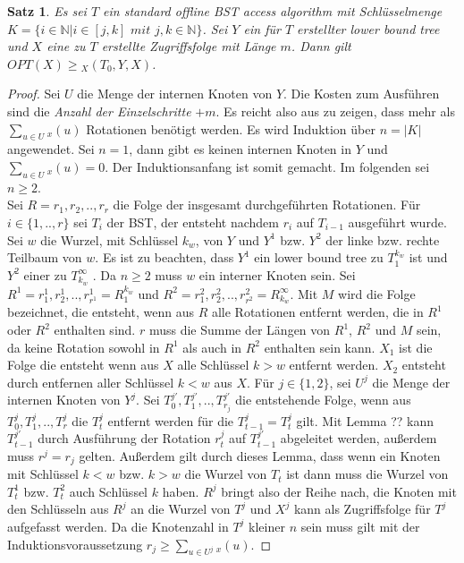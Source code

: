 \documentclass[a4paper,12pt]{article}
\begin{document}
\newtheorem{Satz1}{Satz}[section]
\begin{Satz1} Es sei $T$ ein standard offline BST access algorithm mit Schlüsselmenge ${K = \{  i \in \mathbb{N} \vert i \in \left[j,k\right] \textit{ mit } j,k \in  \mathbb{N} \}} $. Sei $Y$ ein für $T$ erstellter lower bound tree und $X$ eine zu $T$ erstellte Zugriffsfolge mit Länge $m$. Dann gilt  $\mathit{OPT}\left(X\right) \geq {_X(T_0, Y, X)} $.  
\end{Satz1}
\begin{proof}
Sei $U$ die Menge der internen Knoten von $Y$. Die Kosten zum Ausführen sind die \textit{Anzahl der Einzelschritte} $ + {m}$. Es reicht also aus zu zeigen, dass mehr als $\sum_{u \in U} {_x} (u)$ Rotationen benötigt werden. Es wird Induktion über  $n = \vert K \vert$ angewendet. Sei $n = 1$, dann gibt es keinen internen Knoten in $Y$ und $\sum_{u \in U} {_x} (u) = 0$. Der Induktionsanfang ist somit gemacht. Im folgenden sei $n \geq 2$.\\
Sei $R = r_1,r_2,..,r_r$ die Folge der insgesamt durchgeführten Rotationen. Für $i \in \{1,..,r\}$ sei $T_i$ der BST, der entsteht nachdem $r_i$ auf $T_{i-1}$ ausgeführt wurde. Sei $w$ die Wurzel, mit Schlüssel $k_w$, von $Y$ und $Y^1$ bzw. $Y^2$ der linke bzw. rechte Teilbaum von $w$. Es ist zu beachten, dass $Y^1$ ein lower bound tree zu $T_1^{k_w}$ ist und  $Y^2$ einer zu $T^\infty_{k_w}$ . Da $n \geq 2$ muss $w$ ein interner Knoten sein. Sei  $R^1 = r^1_1,r^1_2,..,r^1_{r^1} = R^{k_w}_1$ und $R^2 = r^2_1,r^2_2,..,r^2_{r^2} = R^\infty_{k_w}$. Mit $M$ wird die Folge bezeichnet, die entsteht, wenn aus $R$ alle Rotationen entfernt werden, die in $R^1$ oder $R^2$ enthalten sind. $r$ muss die Summe der Längen von $R^1$, $R^2$ und $M$ sein, da keine Rotation sowohl in $R^1$ als auch in $R^2$ enthalten sein kann. $X_1$ ist die Folge die entsteht wenn aus $X$ alle Schlüssel $k > w$ entfernt werden. $X_2$ entsteht durch entfernen aller Schlüssel $k < w$ aus $X$. Für $j \in \{1,2\}$, sei $U^j$ die Menge der internen Knoten von $Y^j$. Sei $T^{j'}_0,T^{j'}_1,..,T^{j'}_{r_j}$ die entstehende Folge, wenn aus $T^{j}_0,T^{j}_1,..,T^{j}_{r}$ die $T^j_t$ entfernt werden für die $T^j_{t-1} = T^j_t$ gilt. Mit Lemma ?? kann  $T^{j'}_{t-1}$ durch Ausführung der Rotation $r^j_t$ auf $T^{j'}_{t-1}$ abgeleitet werden, außerdem muss $r^j= r_j$ gelten. Außerdem gilt durch dieses Lemma, dass wenn ein Knoten mit Schlüssel $k < w$ bzw. $k > w$ die Wurzel von $T_t$ ist dann muss die Wurzel von $T^1_t$ bzw. $T^2_t$ auch Schlüssel $k$ haben. $R^j$ bringt also der Reihe nach, die Knoten mit den Schlüsseln aus $R^j$ an die Wurzel von $T^j$ und  $X^j$ kann als Zugriffsfolge für $T^j$ aufgefasst werden. Da die Knotenzahl in $T^j$ kleiner $n$ sein muss gilt mit der Induktionsvoraussetzung  $r_j \geq \sum_{u \in U^j} {_x} (u)$.

	
\end{proof}
\end{document}
